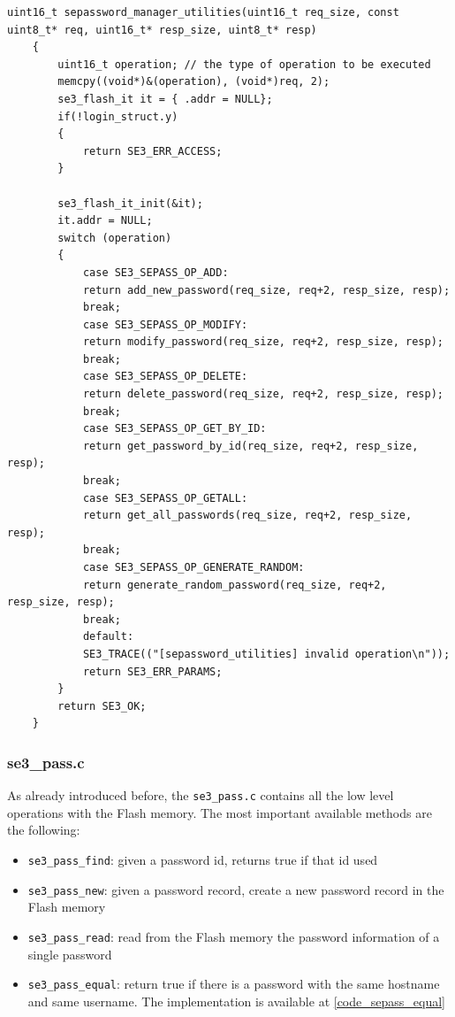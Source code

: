 \begin{lstlisting}[style=CStyle,caption="Code for searching if password record is already present", label=code_command_disp,breaklines=true]
	uint16_t sepassword_manager_utilities(uint16_t req_size, const uint8_t* req, uint16_t* resp_size, uint8_t* resp)
	{
		uint16_t operation; // the type of operation to be executed
		memcpy((void*)&(operation), (void*)req, 2);
		se3_flash_it it = { .addr = NULL};
		if(!login_struct.y)
		{
			return SE3_ERR_ACCESS;
		}
		
		se3_flash_it_init(&it);
		it.addr = NULL;
		switch (operation)
		{
			case SE3_SEPASS_OP_ADD:
			return add_new_password(req_size, req+2, resp_size, resp);
			break;
			case SE3_SEPASS_OP_MODIFY:
			return modify_password(req_size, req+2, resp_size, resp);
			break;
			case SE3_SEPASS_OP_DELETE:
			return delete_password(req_size, req+2, resp_size, resp);
			break;
			case SE3_SEPASS_OP_GET_BY_ID:
			return get_password_by_id(req_size, req+2, resp_size, resp);
			break;
			case SE3_SEPASS_OP_GETALL:
			return get_all_passwords(req_size, req+2, resp_size, resp);
			break;
			case SE3_SEPASS_OP_GENERATE_RANDOM:
			return generate_random_password(req_size, req+2, resp_size, resp);
			break;
			default:
			SE3_TRACE(("[sepassword_utilities] invalid operation\n"));
			return SE3_ERR_PARAMS;
		}
		return SE3_OK;
	}	
\end{lstlisting}



\subsubsection{se3\_pass.c}
As already introduced before, the \texttt{se3\_pass.c} contains all the low level operations with the Flash memory. The most important available methods are the following:
\begin{itemize}
	\item \texttt{se3\_pass\_find}: given a password id, returns true if that id used
	\item \texttt{se3\_pass\_new}: given a password record, create a new password record in the Flash memory
	\item \texttt{se3\_pass\_read}: read from the Flash memory the password information of a single password
	\item \texttt{se3\_pass\_equal}: return true if there is a password with the same hostname and same username. The implementation is available at \ref{code_sepass_equal}
\end{itemize}

